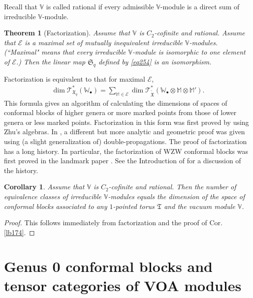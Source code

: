 \documentclass[11pt,b5paper,notitlepage]{article}
\theoremstyle{definition}
\theoremstyle{plain}
\newtheorem{thm}[df]{Theorem}
\newtheorem{co}[df]{Corollary}
\newcommand{\fk}{\mathfrak}
\newcommand{\mc}{\mathcal}
\newcommand{\wtd}{\widetilde}
\newcommand{\scr}{\mathscr}
\newcommand{\blt}{\bullet}
\newcommand{\Vbb}{\mathbb V}
\newcommand{\Wbb}{\mathbb W}
\newcommand{\Mbb}{\mathbb M}
\numberwithin{equation}{section}
\begin{document}
Recall that $\Vbb$ is called rational if every admissible $\Vbb$-module is a direct sum of irreducible $\Vbb$-module.

\begin{thm}[Factorization]\label{lb181}
Assume that $\Vbb$ is $C_2$-cofinite and rational. Assume that $\mc E$ is a maximal set of mutually inequivalent irreducible $\Vbb$-modules. (``Maximal" means that every irreducible $\Vbb$-module is isomorphic to one element of $\mc E$.) Then the linear map $\fk S_q$ defined by \eqref{eq254} is an isomorphism.
\end{thm}


Factorization is equivalent to that for maximal $\mc E$,
\begin{align}
\dim\scr T_{\fk X_q}^*(\Wbb_\blt)=\sum_{\Mbb\in\mc E}\dim\scr T_{\wtd{\fk X}}^*(\Wbb_\blt\otimes\Mbb\otimes\Mbb').
\end{align}
This formula gives an algorithm of calculating the dimensions of spaces of conformal blocks of higher genera or more marked points from those of lower genera or less marked points. Factorization in this form was first proved by \cite{DGT19} using Zhu's algebras. In \cite[Sec. 4.6, 4.7]{Gui}, a different but more analytic and geometric proof was given using (a slight generalization of) double-propagations. The proof of factorization has a long history. In particular, the factorization of WZW conformal blocks was first proved in the landmark paper \cite{TUY89}. See the Introduction of \cite{DGT19} for a discussion of the history.



\begin{co}
Assume that $\Vbb$ is $C_2$-cofinite and rational. Then the number of equivalence classes of irreducible $\Vbb$-modules equals the dimension of the space of conformal blocks associated to any $1$-pointed torus $\fk T$ and the vacuum module $\Vbb$. 
\end{co}
\begin{proof}
This follows immediately from factorization and the proof of Cor. \ref{lb174}.
\end{proof}



\section{Genus 0 conformal blocks and tensor categories of VOA modules}


\subsection{}
\end{document}

